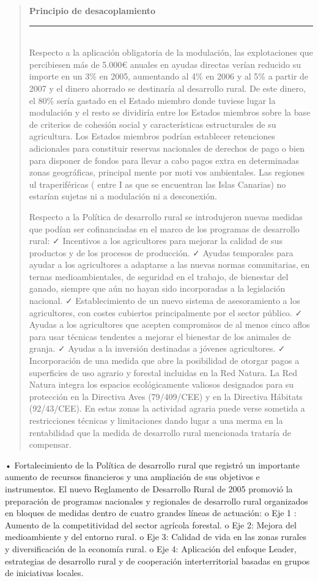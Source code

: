 \documentclass[10pt,a4paper]{article}
\newenvironment{specialblock}[1]{%
      \begin{quote} %
      \small %
      \noindent\textbf{#1}\\[-0.3em] %
      \rule{\linewidth}{0.4pt}\\[0.6em]}{
      \end{quote}}
\begin{document}
\begin{specialblock}{Principio de desacoplamiento}
    Respecto a la aplicación obligatoria de la modulación, las explotaciones que percibiesen más de 5.000€ anuales en ayudas directas verían reducido su importe en un 3\% en 2005, aumentando al 4\% en 2006 y al 5\% a partir de 2007 y el dinero ahorrado se destinaría al desarrollo rural. De este dinero, el 80\% sería gastado en el Estado miembro donde tuviese lugar la modulación y el resto se dividiría entre los Estados miembros sobre la base de criterios de cohesión social y características estructurales de su agricultura. Los Estados miembros podrían establecer retenciones adicionales para constituir reservas nacionales de derechos de pago o bien para disponer de fondos para llevar a cabo pagos extra en determinadas zonas geográficas, principal mente por moti vos ambientales. Las regiones ul traperiféricas ( entre I as que se encuentran las Islas Canarias) no estarían sujetas ni a modulación ni a desconexión.  

    Respecto a la Política de desarrollo rural se introdujeron nuevas medidas que podían ser cofinanciadas en el marco de los programas de desarrollo rural: ✓ Incentivos a los agricultores para mejorar la calidad de sus productos y de los procesos de producción. ✓ Ayudas temporales para ayudar a los agricultores a adaptarse a las nuevas normas comunitarias, en ternas medioambientales, de seguridad en el trabajo, de bienestar del ganado, siempre que aún no hayan sido incorporadas a la legislación nacional. ✓ Establecimiento de un nuevo sistema de asesoramiento a los agricultores, con costes cubiertos principalmente por el sector público. ✓ Ayudas a los agricultores que acepten compromisos de al menos cinco aflos para usar técnicas tendentes a mejorar el bienestar de los animales de granja. ✓ Ayudas a la inversión destinadas a jóvenes agricultores. ✓ Incorporación de una medida que abre la posibilidad de otorgar pagos a superficies de uso agrario y forestal incluidas en la Red Natura. La Red Natura integra los espacios ecológicamente valiosos designados para su protección en la Directiva Aves (79/409/CEE) y en la Directiva Hábitats (92/43/CEE). En estas zonas la actividad agraria puede verse sometida a restricciones técnicas y limitaciones dando lugar a una merma en la rentabilidad que la medida de desarrollo rural mencionada trataría de compensar.
\end{specialblock}

• Fortalecimiento de la Política de desarrollo rural que registró un importante aumento de recursos financieros y una ampliación de sus objetivos e instrumentos. El nuevo Reglamento de Desarrollo Rural de 2005 promovió la preparación de programas nacionales y regionales de desarrollo rural organizados en bloques de medidas dentro de cuatro grandes líneas de actuación:
o Eje 1 : Aumento de la competitividad del sector agrícola forestal.
o Eje 2: Mejora del medioambiente y del entorno rural.
o Eje 3: Calidad de vida en las zonas rurales y diversificación de la economía rural.
o Eje 4: Aplicación del enfoque Leader, estrategias de desarrollo rural y de cooperación interterritorial basadas en grupos de iniciativas locales.
\end{document}

